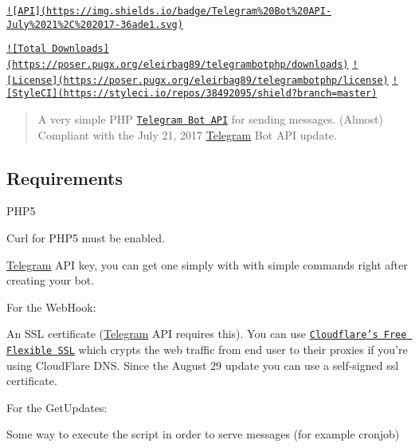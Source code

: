 \href{https://core.telegram.org/bots/api}{\tt !\mbox{[}A\-P\-I\mbox{]}(https\-://img.\-shields.\-io/badge/\-Telegram\%20\-Bot\%20\-A\-P\-I-\/\-July\%2021\%2\-C\%202017-\/36ade1.\-svg)}  

\href{https://packagist.org/packages/eleirbag89/telegrambotphp}{\tt !\mbox{[}Total Downloads\mbox{]}(https\-://poser.\-pugx.\-org/eleirbag89/telegrambotphp/downloads)} \href{https://packagist.org/packages/eleirbag89/telegrambotphp}{\tt !\mbox{[}License\mbox{]}(https\-://poser.\-pugx.\-org/eleirbag89/telegrambotphp/license)} \href{https://styleci.io/repos/38492095}{\tt !\mbox{[}Style\-C\-I\mbox{]}(https\-://styleci.\-io/repos/38492095/shield?branch=master)}

\begin{quotation}
A very simple P\-H\-P \href{https://core.telegram.org/bots}{\tt Telegram Bot A\-P\-I} for sending messages. (Almost) Compliant with the July 21, 2017 \hyperlink{class_telegram}{Telegram} Bot A\-P\-I update.

\end{quotation}


\subsection*{Requirements }


\begin{DoxyItemize}
\item P\-H\-P5
\item Curl for P\-H\-P5 must be enabled.
\item \hyperlink{class_telegram}{Telegram} A\-P\-I key, you can get one simply with \href{https://core.telegram.org/bots#botfather}{\tt } with simple commands right after creating your bot.
\end{DoxyItemize}

For the Web\-Hook\-:
\begin{DoxyItemize}
\item An S\-S\-L certificate (\hyperlink{class_telegram}{Telegram} A\-P\-I requires this). You can use \href{https://www.cloudflare.com/ssl}{\tt Cloudflare's Free Flexible S\-S\-L} which crypts the web traffic from end user to their proxies if you're using Cloud\-Flare D\-N\-S. Since the August 29 update you can use a self-\/signed ssl certificate.
\end{DoxyItemize}

For the Get\-Updates\-:
\begin{DoxyItemize}
\item Some way to execute the script in order to serve messages (for example cronjob)
\end{DoxyItemize}

